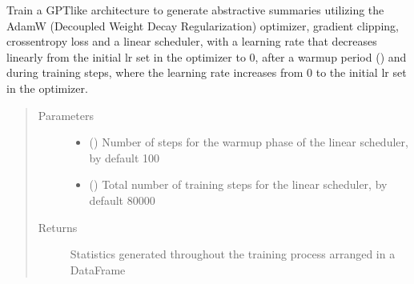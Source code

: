 \documentclass[letterpaper,10pt,english]{sphinxmanual}
\begin{document}
\begin{fulllineitems}
\begin{fulllineitems}
\end{fulllineitems}


\begin{fulllineitems}
\label{\detokenize{code:gpt2_summarizer_train.TrainGPT2Summarizer.train}}
\sphinxAtStartPar
Train a GPT\sphinxhyphen{}like architecture to generate abstractive summaries utilizing the AdamW
(Decoupled Weight Decay Regularization) optimizer, gradient clipping, cross\sphinxhyphen{}entropy loss
and a linear scheduler, with a learning rate that decreases linearly from the initial lr
set in the optimizer to 0, after a warmup period () and during 
training steps, where the learning rate increases from 0 to the initial lr set in the
optimizer.
\begin{quote}\begin{description}
\item[{Parameters}] \leavevmode\begin{itemize}
\item {} 
\sphinxAtStartPar
{} (\sphinxstyleliteralemphasis{\sphinxupquote{, }}) \textendash{} Number of steps for the warmup phase of the linear scheduler, by default 100

\item {} 
\sphinxAtStartPar
{} (\sphinxstyleliteralemphasis{\sphinxupquote{, }}) \textendash{} Total number of training steps for the linear scheduler, by default 80000

\end{itemize}

\item[{Returns}] \leavevmode
\sphinxAtStartPar
Statistics generated throughout the training process arranged in a DataFrame


\end{description}
\end{quote}
\end{fulllineitems}
\end{fulllineitems}
\end{document}
